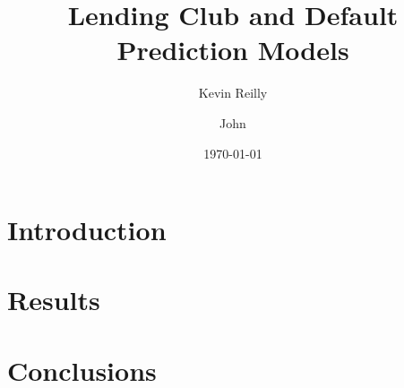 \documentclass[11pt]{article}
\title{Lending Club and Default Prediction Models}
\author{Kevin Reilly}
\author{John}
\affil{University of Utah -- Machine Learning}
\date{\today}
\begin{document}
\maketitle

\begin{abstract}
	
\end{abstract}

\section{Introduction}







\section{Results}\label{sec:Results}



\section{Conclusions}




\nocite{*}

\newpage{}




\end{document}
